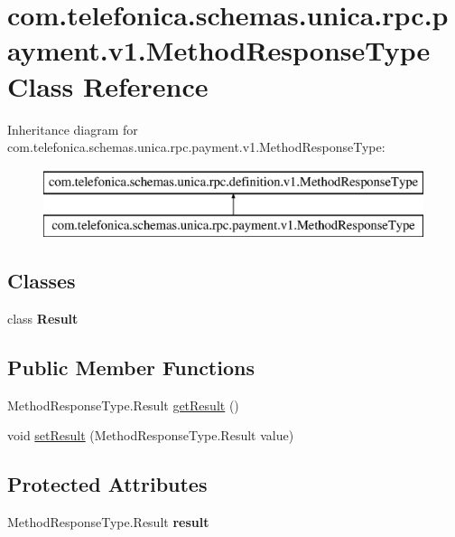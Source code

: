 \hypertarget{classcom_1_1telefonica_1_1schemas_1_1unica_1_1rpc_1_1payment_1_1v1_1_1MethodResponseType}{
\section{com.telefonica.schemas.unica.rpc.payment.v1.MethodResponseType Class Reference}
\label{classcom_1_1telefonica_1_1schemas_1_1unica_1_1rpc_1_1payment_1_1v1_1_1MethodResponseType}
}
Inheritance diagram for com.telefonica.schemas.unica.rpc.payment.v1.MethodResponseType:\begin{figure}[H]
\begin{center}
\leavevmode
\includegraphics[height=2.000000cm]{classcom_1_1telefonica_1_1schemas_1_1unica_1_1rpc_1_1payment_1_1v1_1_1MethodResponseType}
\end{center}
\end{figure}
\subsection*{Classes}
\begin{DoxyCompactItemize}
\item 
class {\bfseries Result}
\end{DoxyCompactItemize}
\subsection*{Public Member Functions}
\begin{DoxyCompactItemize}
\item 
MethodResponseType.Result \hyperlink{classcom_1_1telefonica_1_1schemas_1_1unica_1_1rpc_1_1payment_1_1v1_1_1MethodResponseType_a6a9554ea07ab3bc0e5dfc1511478ab09}{getResult} ()
\item 
void \hyperlink{classcom_1_1telefonica_1_1schemas_1_1unica_1_1rpc_1_1payment_1_1v1_1_1MethodResponseType_a87c6c2098eeef522405f940ae30785a2}{setResult} (MethodResponseType.Result value)
\end{DoxyCompactItemize}
\subsection*{Protected Attributes}
\begin{DoxyCompactItemize}
\item 
\hypertarget{classcom_1_1telefonica_1_1schemas_1_1unica_1_1rpc_1_1payment_1_1v1_1_1MethodResponseType_afae0dad420c70537c7b44af9bfc5afed}{
MethodResponseType.Result {\bfseries result}}
\label{classcom_1_1telefonica_1_1schemas_1_1unica_1_1rpc_1_1payment_1_1v1_1_1MethodResponseType_afae0dad420c70537c7b44af9bfc5afed}

\end{DoxyCompactItemize}


